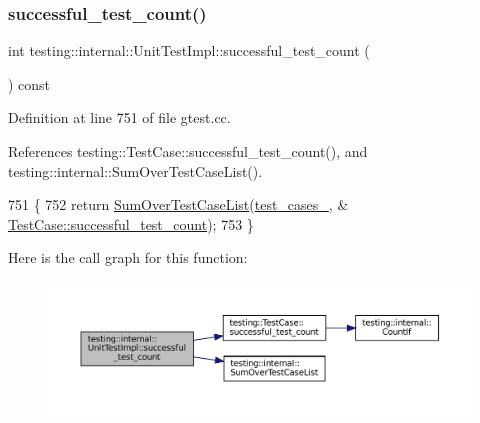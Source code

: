 \subsubsection{\texorpdfstring{successful\+\_\+test\+\_\+count()}{successful\_test\_count()}}
{\footnotesize\ttfamily int testing\+::internal\+::\+Unit\+Test\+Impl\+::successful\+\_\+test\+\_\+count (\begin{DoxyParamCaption}{ }\end{DoxyParamCaption}) const}



Definition at line 751 of file gtest.\+cc.



References testing\+::\+Test\+Case\+::successful\+\_\+test\+\_\+count(), and testing\+::internal\+::\+Sum\+Over\+Test\+Case\+List().


\begin{DoxyCode}
751                                               \{
752   \textcolor{keywordflow}{return} \hyperlink{namespacetesting_1_1internal_a564f9e608c608736ebe2199ab831745b}{SumOverTestCaseList}(\hyperlink{classtesting_1_1internal_1_1UnitTestImpl_a79ec0f733ada2898efd1a7fbd8587fb3}{test\_cases\_}, &
      \hyperlink{classtesting_1_1TestCase_ab61929942a202f03903182866bd0e086}{TestCase::successful\_test\_count});
753 \}
\end{DoxyCode}
Here is the call graph for this function\+:
\nopagebreak
\begin{figure}[H]
\begin{center}
\leavevmode
\includegraphics[width=350pt]{classtesting_1_1internal_1_1UnitTestImpl_ac363f681cbecf10fea5c04408b98e744_cgraph}
\end{center}
\end{figure}
\mbox{\label{classtesting_1_1internal_1_1UnitTestImpl_aff65061646c6b9857b37097423500bfe}} 
